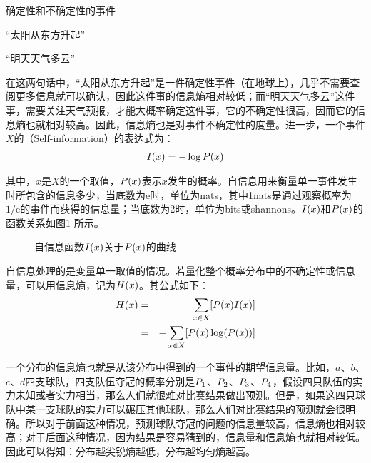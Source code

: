 \begin{example}
确定性和不确定性的事件

\qquad\qquad\quad“太阳从东方升起”

\qquad\qquad\quad“明天天气多云”
\label{eg:2-1}
\end{example}

\parinterval 在这两句话中，“太阳从东方升起”是一件确定性事件（在地球上），几乎不需要查阅更多信息就可以确认，因此这件事的信息熵相对较低；而“明天天气多云”这件事，需要关注天气预报，才能大概率确定这件事，它的不确定性很高，因而它的信息熵也就相对较高。因此，信息熵也是对事件不确定性的度量。进一步，一个事件$X$的{\small{}}（Self-information）的表达式为：
\begin{eqnarray}
{I}(x)=-\log {P}(x)
\label{eq:2-13}
\end{eqnarray}

\noindent 其中，$x$是$X$的一个取值，${P}(x)$表示$x$发生的概率。自信息用来衡量单一事件发生时所包含的信息多少，当底数为e时，单位为nats，其中1nats是通过观察概率为$1/\textrm{e}$的事件而获得的信息量；当底数为2时，单位为bits或shannons。${I}(x)$和${P}(x)$的函数关系如图\ref{fig:2-3} 所示。

\begin{figure}[htp]
\centering

\caption{自信息函数${I}(x)$关于${P}(x)$的曲线}
\label{fig:2-3}
\end{figure}

\parinterval 自信息处理的是变量单一取值的情况。若量化整个概率分布中的不确定性或信息量，可以用信息熵，记为${H}(x)$。其公式如下：
\begin{eqnarray}
{H}(x) & = & \sum_{x \in X}[ {P}(x) {I}(x)] \nonumber \\
              & = & - \sum_{x \in X } [{P}(x)\log({P}(x)) ]
\label{eq:2-14}
\end{eqnarray}

\parinterval 一个分布的信息熵也就是从该分布中得到的一个事件的期望信息量。比如，$a$、$b$、$c$、$d$四支球队，四支队伍夺冠的概率分别是${P}_1$、${P}_2$、${P}_3$、${P}_4$，假设四只队伍的实力未知或者实力相当，那么人们就很难对比赛结果做出预测。但是，如果这四只球队中某一支球队的实力可以碾压其他球队，那么人们对比赛结果的预测就会很明确。所以对于前面这种情况，预测球队夺冠的问题的信息量较高，信息熵也相对较高；对于后面这种情况，因为结果是容易猜到的，信息量和信息熵也就相对较低。因此可以得知：分布越尖锐熵越低，分布越均匀熵越高。

